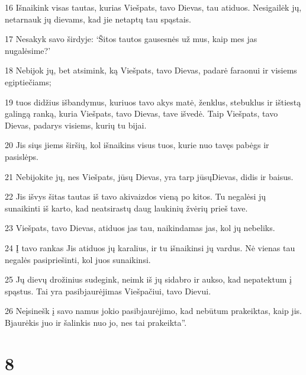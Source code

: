 \par 16 Išnaikink visas tautas, kurias Viešpats, tavo Dievas, tau atiduos. Nesigailėk jų, netarnauk jų dievams, kad jie netaptų tau spąstais. 
\par 17 Nesakyk savo širdyje: ‘Šitos tautos gausesnės už mus, kaip mes jas nugalėsime?’ 
\par 18 Nebijok jų, bet atsimink, ką Viešpats, tavo Dievas, padarė faraonui ir visiems egiptiečiams; 
\par 19 tuos didžius išbandymus, kuriuos tavo akys matė, ženklus, stebuklus ir ištiestą galingą ranką, kuria Viešpats, tavo Dievas, tave išvedė. Taip Viešpats, tavo Dievas, padarys visiems, kurių tu bijai. 
\par 20 Jis siųs jiems širšių, kol išnaikins visus tuos, kurie nuo tavęs pabėgs ir pasislėps. 
\par 21 Nebijokite jų, nes Viešpats, jūsų Dievas, yra tarp jūsų­Dievas, didis ir baisus. 
\par 22 Jis išvys šitas tautas iš tavo akivaizdos vieną po kitos. Tu negalėsi jų sunaikinti iš karto, kad neatsirastų daug laukinių žvėrių prieš tave. 
\par 23 Viešpats, tavo Dievas, atiduos jas tau, naikindamas jas, kol jų nebeliks. 
\par 24 Į tavo rankas Jis atiduos jų karalius, ir tu išnaikinsi jų vardus. Nė vienas tau negalės pasipriešinti, kol juos sunaikinsi. 
\par 25 Jų dievų drožinius sudegink, neimk iš jų sidabro ir aukso, kad nepatektum į spąstus. Tai yra pasibjaurėjimas Viešpačiui, tavo Dievui. 
\par 26 Neįsinešk į savo namus jokio pasibjaurėjimo, kad nebūtum prakeiktas, kaip jis. Bjaurėkis juo ir šalinkis nuo jo, nes tai prakeikta”.



\chapter{8}

